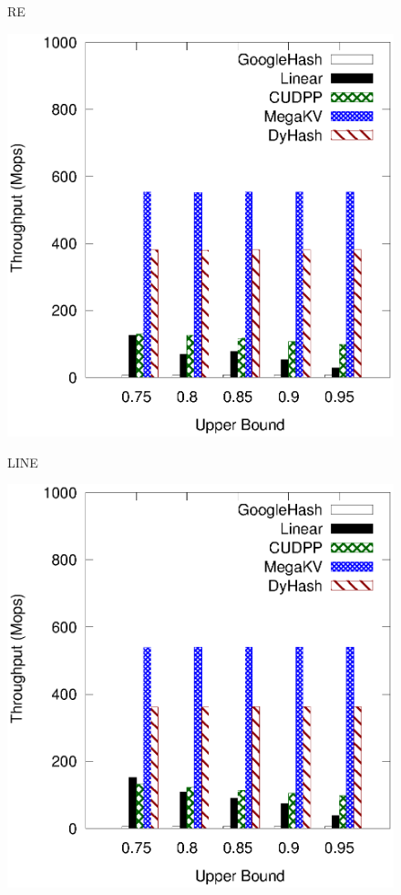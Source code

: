 \begin{figure}[h]
\begin{minipage}{0.19\linewidth}
	\centerline{RE}
	\end{minipage}
	\hfill
	\begin{minipage}{0.19\linewidth}\centering
	\includegraphics[width=\linewidth]{pic/static-upper/upper_search_tpch.eps}
	\centerline{LINE}
	\end{minipage}
	\hfill
        \begin{minipage}{0.19\linewidth}\centering
	\includegraphics[width=\linewidth]{pic/static-upper/upper_search_random.eps}

\end{minipage}
\end{figure}
